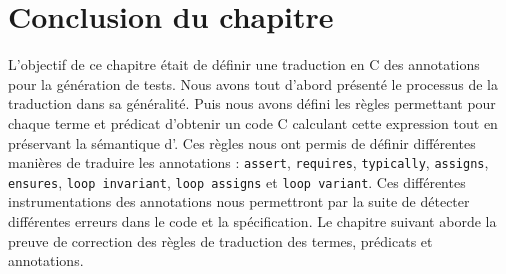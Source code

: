\section*{Conclusion du chapitre}

L'objectif de ce chapitre était de définir une traduction en C des annotations
\eacsl pour la génération de tests.
Nous avons tout d'abord présenté le processus de la traduction dans sa
généralité.
Puis nous avons défini les règles permettant pour chaque terme et prédicat
\eacsl d'obtenir un code C calculant cette expression tout en préservant la
sémantique d'\eacsl.
Ces règles nous ont permis de définir différentes manières de traduire les
annotations \eacsl : \lstinline'assert', \lstinline'requires',
\lstinline'typically', \lstinline'assigns', \lstinline'ensures',
\lstinline'loop invariant', \lstinline'loop assigns' et
\lstinline'loop variant'.
Ces différentes instrumentations des annotations nous permettront par la suite
de détecter différentes erreurs dans le code et la spécification.
Le chapitre suivant aborde la preuve de correction des règles de traduction des
termes, prédicats et annotations.
